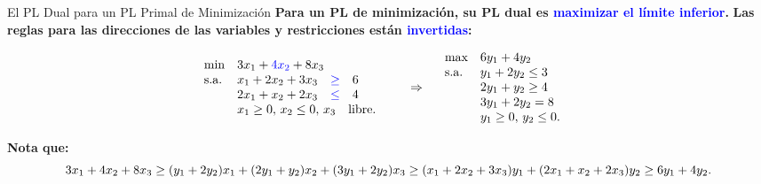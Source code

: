 \documentclass{beamer}
\begin{document}
\begin{frame}{El PL Dual para un PL Primal de Minimización}
    \textbf{Para un PL de minimización, su PL dual es \textcolor{blue}{maximizar el límite inferior}.}
    \textbf{Las reglas para las direcciones de las variables y restricciones están \textcolor{blue}{invertidas}:}
    
    \vspace{0.3cm}
    \[
    \begin{array}{lll}
    \text{min} & 3x_1 + \textcolor{blue}{4x_2} + 8x_3 & \\
    \text{s.a.} & x_1 + 2x_2 + 3x_3 \quad \text{\textcolor{blue}{$\geq$}} \quad 6 & \\
    & 2x_1 + x_2 + 2x_3 \quad \text{\textcolor{blue}{$\leq$}} \quad 4 & \\
    & x_1 \geq 0, \, x_2 \leq 0, \, x_3 \quad \text{libre}. &
    \end{array}
    \quad \Rightarrow \quad
    \begin{array}{lll}
    \text{max} & 6y_1 + 4y_2 & \\
    \text{s.a.} & y_1 + 2y_2 \leq 3 & \\
    & 2y_1 + y_2 \geq 4 & \\
    & 3y_1 + 2y_2 = 8 & \\
    & y_1 \geq 0, \, y_2 \leq 0. &
    \end{array}
    \]

    \vspace{0.3cm}
    \textbf{Nota que:}
    \[
    3x_1 + 4x_2 + 8x_3 \\
    \geq (y_1 + 2y_2)x_1 + (2y_1 + y_2)x_2 + (3y_1 + 2y_2)x_3 \\
    \geq (x_1 + 2x_2 + 3x_3)y_1 + (2x_1 + x_2 + 2x_3)y_2 \\
    \geq 6y_1 + 4y_2.
    \]
\end{frame}
\end{document}
